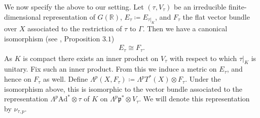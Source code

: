 \documentclass[11pt,reqno]{amsart}
\numberwithin{equation}{section}
\theoremstyle{definition}
\theoremstyle{remark}
\newcommand{\mf}[1]{\mathfrak{#1}}
\newcommand{\R}{\mathbb{R}}
\begin{document}
We now specify the above to our setting. Let $(\tau,V_\tau)$ be an irreducible finite-dimensional representation of $G(\R)$, $E_\tau\coloneqq E_{\tau|_K}$, and $F_\tau$ the flat vector bundle over $X$ associated to the restriction of $\tau$ to $\Gamma$. Then we have a canonical isomorphism (see \cite{MM}, Proposition $3.1$)
\begin{align*}
    E_\tau\cong F_\tau.
\end{align*}
As $K$ is compact there exists an inner product on $V_\tau$ with respect to which $\tau|_K$ is unitary. Fix such an inner product. From this we induce a metric on $E_\tau$, and hence on $F_\tau$ as well. Define $\Lambda^p(X,F_\tau)\coloneqq \Lambda^pT^*(X)\otimes F_\tau$. Under the isomorphism above, this is isomorphic to the vector bundle associated to the representation $\Lambda^p\text{Ad}^*\otimes \tau$ of $K$ on $\Lambda^p\mf{p}^*\otimes V_\tau$. We will denote this representation by $\nu_{\tau,p}$. 
\end{document}
